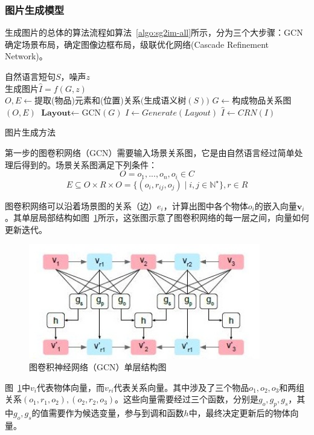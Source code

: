 \subsubsection{图片生成模型}
生成图片的总体的算法流程如算法~\ref{algo:sg2im-all}所示，分为三个大步骤：GCN确定场景布局，确定图像边框布局，级联优化网络(Cascade Refinement Network)。

\begin{algorithm}[H]
    \SetAlgoLined
    \vspace{2em}
    \algorithmicrequire 自然语言短句$S$，噪声$z$\\
    \algorithmicensure 生成图片$\hat{I} = f(G,z)$\\
    $O,E \gets $提取(物品)元素和(位置)关系$($生成语义树$(S))$\;
    $G \gets $构成物品关系图$(O,E)$\;
    $\textbf{Layout} \gets $GCN$(G)$\;
    $I \gets Generate(Layout)$ \;
    $\hat{I} \gets CRN(I)$\;
    \caption{图片生成方法}
    \label{algo:sg2im-all}
\end{algorithm}

\vspace{2em}
第一步的图卷积网络（GCN）需要输入场景关系图，它是由自然语言经过简单处理后得到的。场景关系图满足下列条件：
$$O={o_1,...,o_n},o_i \in C$$
$$E \subseteq O \times R \times O =\{(o_i,r_{ij},o_j)\mid i,j \in \mathbb{N}^\star\}, r \in R$$

图卷积网络可以沿着场景图的关系（边）$e_i$，计算出图中各个物体$o_i$的嵌入向量$ \textbf{v}_i$。其单层局部结构如图~\ref{fig:gcn}所示，这张图示意了图卷积网络的每一层之间，向量如何更新迭代。

\begin{figure}[!htb]
    \centering
    \includegraphics[width=0.9\textwidth]{figures/gcn.png}
    \caption{图卷积神经网络（GCN）单层结构图}
    \label{fig:gcn}
\end{figure}
图~\ref{fig:gcn}中$v_i$代表物体向量，而$v_{ri}$代表关系向量。其中涉及了三个物品$o_1, o_2, o_3$和两组关系$(o_1,r_1,o_2), (o_2,r_2,o_3)$。这些向量需要经过三个函数，分别是$g_o, g_p, g_s$，其中$g_o, g_s$的值需要作为候选变量，参与到调和函数$h$中，最终决定更新后的物体向量。

